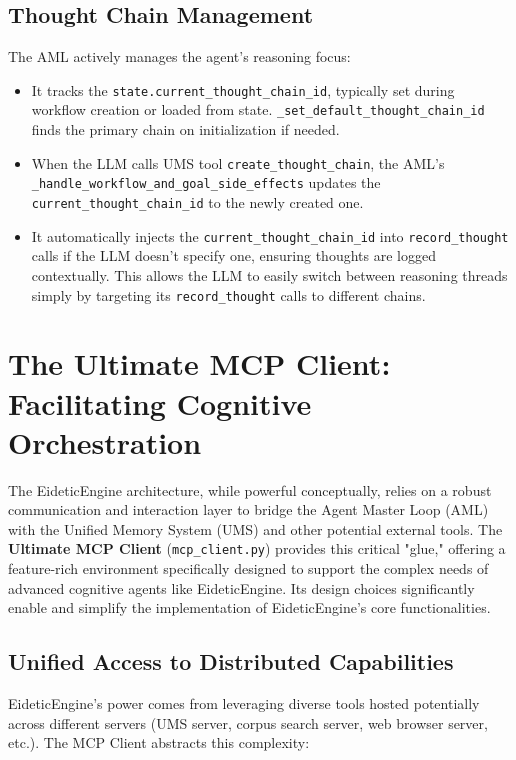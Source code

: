 \documentclass[12pt,a4paper]{article}
\newcommand{\code}[1]{\nolinkurl{#1}}
\begin{document}
\subsection{Thought Chain Management}

The AML actively manages the agent's reasoning focus:

\begin{itemize}
    \item It tracks the \code{state.current\_thought\_chain\_id}, typically set during workflow creation or loaded from state. \code{\_set\_default\_thought\_chain\_id} finds the primary chain on initialization if needed.
    \item When the LLM calls UMS tool \code{create\_thought\_chain}, the AML's \code{\_handle\_workflow\_and\_goal\_side\_effects} updates the \code{current\_thought\_chain\_id} to the newly created one.
    \item It automatically injects the \code{current\_thought\_chain\_id} into \code{record\_thought} calls if the LLM doesn't specify one, ensuring thoughts are logged contextually. This allows the LLM to easily switch between reasoning threads simply by targeting its \code{record\_thought} calls to different chains.
\end{itemize}

\section{The Ultimate MCP Client: Facilitating Cognitive Orchestration}

The EideticEngine architecture, while powerful conceptually, relies on a robust communication and interaction layer to bridge the Agent Master Loop (AML) with the Unified Memory System (UMS) and other potential external tools. The \textbf{Ultimate MCP Client} (\code{mcp\_client.py}) provides this critical "glue," offering a feature-rich environment specifically designed to support the complex needs of advanced cognitive agents like EideticEngine. Its design choices significantly enable and simplify the implementation of EideticEngine's core functionalities.

\subsection{Unified Access to Distributed Capabilities}

EideticEngine's power comes from leveraging diverse tools hosted potentially across different servers (UMS server, corpus search server, web browser server, etc.). The MCP Client abstracts this complexity:
\end{document}
